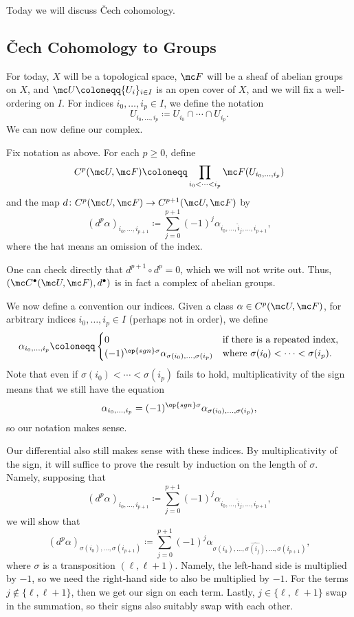 \documentclass[../notes.tex]{subfiles}
\begin{document}
Today we will discuss \v Cech cohomology.

\subsection{\v Cech Cohomology to Groups}
For today, $X$ will be a topological space, $\mc F$ will be a sheaf of abelian groups on $X$, and $\mc U\coloneqq\{U_i\}_{i\in I}$ is an open cover of $X$, and we will fix a well-ordering on $I$. For indices $i_0,\ldots,i_p\in I$, we define the notation
\[U_{i_0,\ldots,i_p}\coloneqq U_{i_0}\cap\cdots\cap U_{i_p}.\]
We can now define our complex.
\begin{defihelper} 
	Fix notation as above. For each $p\ge0$, define
	\[C^p(\mc U,\mc F)\coloneqq\prod_{i_0<\cdots<i_p}\mc F(U_{i_0,\ldots,i_p})\]
	and the map $d\colon C^p(\mc U,\mc F)\to C^{p+1}(\mc U,\mc F)$ by
	\[(d^p\alpha)_{i_0,\ldots,i_{p+1}}\coloneqq\sum_{j=0}^{p+1}(-1)^j\alpha_{i_0,\ldots,\widehat i_j,\ldots,i_{p+1}},\]
	where the hat means an omission of the index.
\end{defihelper}
\begin{remark}
	One can check directly that $d^{p+1}\circ d^p=0$, which we will not write out. Thus, $(\mc C^\bullet(\mc U,\mc F),d^\bullet)$ is in fact a complex of abelian groups.
\end{remark}
We now define a convention our indices. Given a class $\alpha\in C^p(\mc U,\mc F)$, for arbitrary indices $i_0,\ldots,i_p\in I$ (perhaps not in order), we define
\[\alpha_{i_0,\ldots,i_p}\coloneqq\begin{cases}
	0 & \text{if there is a repeated index}, \\
	(-1)^{\op{sgn}\sigma}\alpha_{\sigma(i_0),\ldots,\sigma(i_p)} & \text{where }\sigma(i_0)<\cdots<\sigma(i_p).
\end{cases}\]
Note that even if $\sigma(i_0)<\cdots<\sigma(i_p)$ fails to hold, multiplicativity of the sign means that we still have the equation
\[\alpha_{i_0,\ldots,i_p}=(-1)^{\op{sgn}\sigma}\alpha_{\sigma(i_0),\ldots,\sigma(i_p)},\]
so our notation makes sense.
\begin{remark}
	Our differential also still makes sense with these indices. By multiplicativity of the sign, it will suffice to prove the result by induction on the length of $\sigma$. Namely, supposing that
	\[(d^p\alpha)_{i_0,\ldots,i_{p+1}}\coloneqq\sum_{j=0}^{p+1}(-1)^j\alpha_{i_0,\ldots,\widehat i_j,\ldots,i_{p+1}},\]
	we will show that
	\[(d^p\alpha)_{\sigma(i_0),\ldots,\sigma(i_{p+1})}\coloneqq\sum_{j=0}^{p+1}(-1)^j\alpha_{\sigma(i_0),\ldots,\widehat{\sigma(i_j)},\ldots,\sigma(i_{p+1})},\]
	where $\sigma$ is a transposition $(\ell,\ell+1)$. Namely, the left-hand side is multiplied by $-1$, so we need the right-hand side to also be multiplied by $-1$. For the terms $j\notin\{\ell,\ell+1\}$, then we get our sign on each term. Lastly, $j\in\{\ell,\ell+1\}$ swap in the summation, so their signs also suitably swap with each other.
\end{remark}
\end{document}
